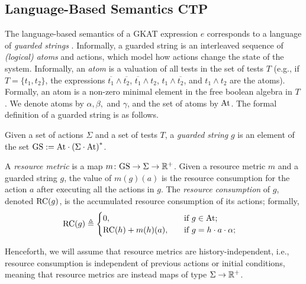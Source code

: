\subsection{Language-Based Semantics CTP}
The language-based semantics of a GKAT expression $e$ corresponds to a language of \emph{guarded strings} \cite{GKAT}. Informally, a guarded string is an interleaved sequence of \emph{(logical) atoms} and actions, which model how actions change the state of the system. Informally, an \emph{atom} is a valuation of all tests in the set of tests $T$ (e.g., if $T=\{t_1,t_2\}$, the expressions  $\overline{t_1}\land \overline{t_2}$, $\overline{t_1}\land {t_2}$, $t_1\land \overline{t_2}$, and $t_1\land {t_2}$ are the atoms). Formally, an atom is a non-zero minimal element in the free boolean algebra in $T$ \cite{KAT}. We denote atoms by $\alpha, \beta,$ and $\gamma$, and the set of atoms by $\text{At}$. The formal definition of a guarded string is as follows.

\begin{definition}
Given a set of actions $\Sigma$ and a set of tests $T$, a \emph{guarded string} $g$ is an element of the set $\text{GS} := \text{At} \cdot \left(\Sigma\cdot \text{At}\right)^{*}$. 
\end{definition}


\begin{definition}
A \emph{resource metric} is a map $m\colon \text{GS} \rightarrow \Sigma \rightarrow \mathbb{R}^{+}$. Given a resource metric $m$ and a guarded string $g$, the value of $m(g)(a)$ is the {resource consumption for the action $a$ after executing all the actions in $g$}. The \emph{resource consumption} of $g$, denoted $\text{RC}(g)$, is the accumulated resource consumption of its actions; formally,
\begin{align}
\text{RC}(g)&\triangleq 
\begin{cases}
0, &\quad \text{if $g \in\text{At}$;}\\
\text{RC}(h) + m(h)(a),&\quad \text{if $g=h \cdot a\cdot \alpha $;}\\
\end{cases}
\end{align}

{\color{red}Henceforth, we will assume that resource metrics are history-independent, i.e., resource consumption is independent of previous actions or initial conditions, meaning that resource metrics are instead maps of type $\Sigma \rightarrow \mathbb{R}^{+}$.  }

\end{definition}

